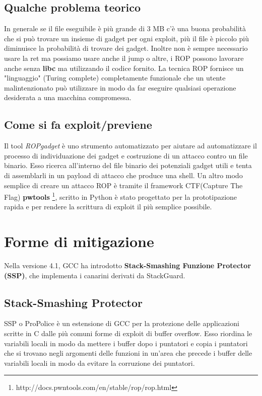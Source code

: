 \subsection{Qualche problema teorico}
In generale se il file eseguibile è più grande di 3 MB c'è una buona probabilità che si può trovare un insieme di gadget per ogni exploit, più il file è piccolo più diminuisce la probabilità di trovare dei gadget. Inoltre non è sempre necessario usare la ret ma possiamo usare anche il jump o altre, i ROP possono lavorare anche senza \textbf{libc} ma utilizzando il codice fornito. La tecnica ROP fornisce un  "linguaggio" (Turing complete) completamente funzionale che un utente malintenzionato può utilizzare
in modo da far eseguire  qualsiasi operazione desiderata a una macchina compromessa.

\subsection{Come si fa exploit/previene}
Il tool \textit{ROPgadget} è uno strumento automatizzato per aiutare ad automatizzare il processo di individuazione dei gadget e costruzione di un attacco contro un file binario. Esso ricerca all'interno del file binario dei potenziali gadget utili e tenta di assemblarli in un payload di attacco che produce una shell. Un altro modo semplice di creare un attacco ROP è tramite il framework CTF(Capture The Flag) \textbf{pwtools} \footnote{http://docs.pwntools.com/en/stable/rop/rop.html}, scritto in Python è stato progettato per la prototipazione rapida e per rendere la scrittura di exploit il più semplice possibile.


\newpage
\section{Forme di mitigazione}
Nella versione 4.1, GCC ha introdotto \textbf{Stack-Smashing Funzione Protector (SSP)}, che implementa i canarini derivati da StackGuard.

\subsection{Stack-Smashing Protector}
SSP o ProPolice è un estensione di GCC per la protezione delle applicazioni scritte in C dalle più comuni forme di exploit di buffer overflow. Esso riordina le variabili locali in modo da mettere i buffer dopo i puntatori e copia i puntatori che si trovano negli argomenti delle funzioni in un'area che precede i buffer delle variabili locali in modo da evitare la corruzione dei puntatori.

